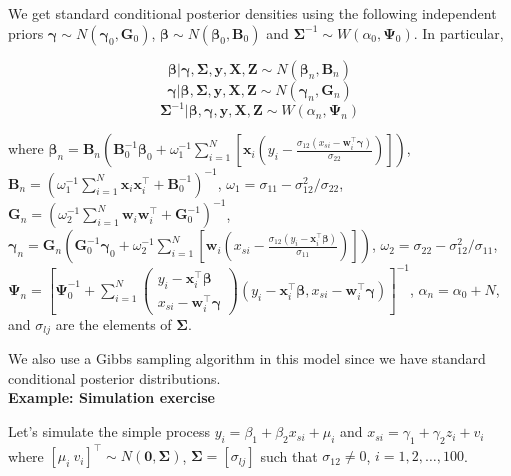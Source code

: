 We get standard conditional posterior densities using the following independent priors $\bm{\gamma}\sim {N}(\bm{\gamma}_0,\bm{G}_0)$, $\bm{\beta}\sim {N}(\bm{\beta}_0,\bm{B}_0)$ and $\bm{\Sigma}^{-1} \sim {W}(\alpha_0,\bm{\Psi}_0)$.
In particular, 

\begin{equation*}
	\bm{\beta}|\bm{\gamma},\bm{\Sigma},\bm{y},\bm{X},\bm{Z}\sim {N}(\bm{\beta}_n,\bm{B}_n)
\end{equation*}
\begin{equation*}
	\bm{\gamma}|\bm{\beta},\bm{\Sigma},\bm{y},\bm{X},\bm{Z}\sim {N}(\bm{\gamma}_n,\bm{G}_n)
\end{equation*}
\begin{equation*}
	\bm{\Sigma}^{-1}|\bm{\beta},\bm{\gamma},\bm{y},\bm{X},\bm{Z}\sim {W}(\alpha_n,\bm{\Psi}_n)
\end{equation*}

where $\bm{\beta}_n=\bm{B}_n\left(\bm{B}_0^{-1}\bm{\beta}_0 + \omega_1^{-1}\sum_{i=1}^{N}\left[\bm{x}_i\left(y_i-\frac{\sigma_{12}(x_{si}-\bm{w}_i^{\top}\bm{\gamma})}{\sigma_{22}}\right)\right]\right)$, $\bm{B}_n=(\omega_1^{-1}\sum_{i=1}^{N}\bm{x}_i\bm{x}_i^{\top}+\bm{B}_0^{-1})^{-1}$, $\omega_1=\sigma_{11}-\sigma_{12}^2/\sigma_{22}$, $\bm{G}_n=(\omega_2^{-1}\sum_{i=1}^{N}\bm{w}_i\bm{w}_i^{\top}+\bm{G}_0^{-1})^{-1}$, $\bm{\gamma}_n=\bm{G}_n\left(\bm{G}_0^{-1}\bm{\gamma}_0 + \omega_2^{-1}\sum_{i=1}^{N}\left[\bm{w}_i\left(x_{si}-\frac{\sigma_{12}(y_{i}-\bm{x}_i^{\top}\bm{\beta})}{\sigma_{11}}\right)\right]\right)$,
$\omega_2=\sigma_{22}-\sigma_{12}^2/\sigma_{11}$, $\bm{\Psi}_n=\left[\bm{\Psi}_0^{-1}+\sum_{i=1}^N \begin{pmatrix}
	y_i-\bm{x}_i^{\top}\bm{\beta} \\
	x_{si}-\bm{w}_i^{\top}\bm{\gamma}
\end{pmatrix} (y_i-\bm{x}_i^{\top}\bm{\beta}, x_{si} -\bm{w}_i^{\top}\bm{\gamma})\right]^{-1}$, $\alpha_n=\alpha_0+N$, and $\sigma_{lj}$ are the elements of $\bm{\Sigma}$.

We also use a Gibbs sampling algorithm in this model since we have standard conditional posterior distributions.\\

\textbf{Example: Simulation exercise}

Let's simulate the simple process $y_i=\beta_1+\beta_2x_{si}+\mu_i$ and $x_{si}=\gamma_1+\gamma_2z_i+v_i$ where $[\mu_i \ v_i]^{\top}\sim N(\bm{0},\bm{\Sigma})$, $\bm{\Sigma}=[\sigma_{lj}]$ such that $\sigma_{12}\neq 0$, $i=1,2,\dots,100$.

